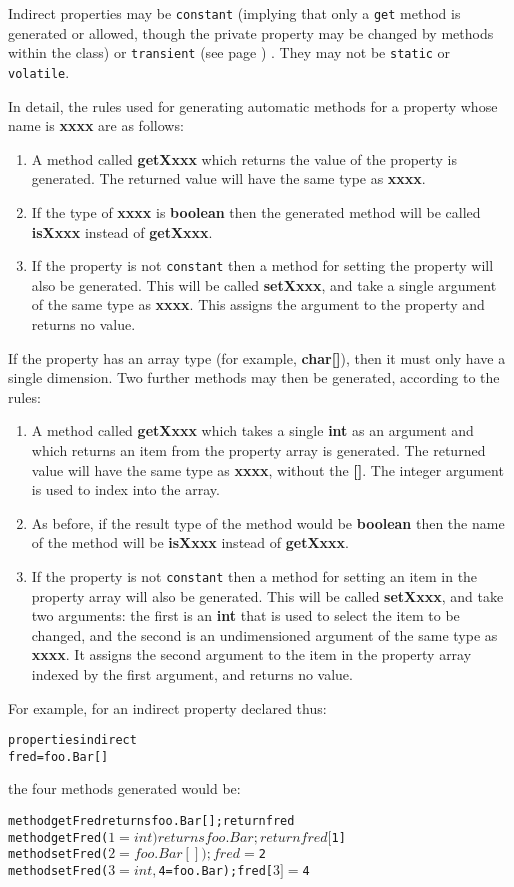 Indirect properties may be \texttt{constant} (implying that only
a \texttt{get} method is generated or allowed, though the private property
may be changed by methods within the class)
or  \texttt{transient} (see page \pageref{refpropmod}) .
They may not be \texttt{static} or \texttt{volatile}.
 
In detail, the rules used for generating automatic methods for a
property whose name is \textbf{xxxx} are as follows:
\begin{enumerate}
\item A method called \textbf{getXxxx} which returns the value of the
property is generated.  The returned value will have the same type
as \textbf{xxxx}.
\item If the type of \textbf{xxxx} is \textbf{boolean} then the generated
method will be called \textbf{isXxxx} instead of \textbf{getXxxx}.
\item If the property is not \texttt{constant} then a method for setting the
property will also be generated.  This will be called \textbf{setXxxx},
and take a single argument of the same type as \textbf{xxxx}.  This
assigns the argument to the property and returns no value.
\end{enumerate}
 
If the property has an array type (for example, \textbf{char[]}),
then it must only have a single dimension.
Two further methods may then be generated, according to the rules:
\begin{enumerate}
\item A method called \textbf{getXxxx} which takes a single \textbf{int}
as an argument and which returns an item from the property array is
generated. The returned value will have the same type as \textbf{xxxx},
without the \textbf{[]}.  The integer argument is used to
index into the array.
\item As before, if the result type of the method would be \textbf{boolean}
then the name of the method will be \textbf{isXxxx} instead
of \textbf{getXxxx}.
\item If the property is not \texttt{constant} then a method for setting an
item in the property array will also be generated.
This will be called \textbf{setXxxx}, and take two arguments: the
first is an \textbf{int} that is used to select the item to be
changed, and the second is an undimensioned argument of the same type
as \textbf{xxxx}.  It assigns the second argument to the item in the
property array indexed by the first argument, and returns no value.
\end{enumerate}
 For example, for an indirect property declared thus:
\begin{alltt}
properties indirect
  fred=foo.Bar[]
\end{alltt}
the four methods generated would be:
\begin{alltt}
method getFred returns foo.Bar[]; return fred
method getFred($1=int) returns foo.Bar; return fred[$1]
method setFred($2=foo.Bar[]); fred=$2
method setFred($3=int, $4=foo.Bar); fred[$3]=$4
\end{alltt}
 
